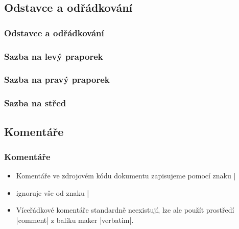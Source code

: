 \subsection{Odstavce a odřádkování}
\begin{frame}
	\frametitle{Odstavce a odřádkování}
	\UnderConstruction
\end{frame}


\begin{frame}
	\frametitle{Sazba na levý praporek}
	\bigskip
\end{frame}


\begin{frame}
	\frametitle{Sazba na pravý praporek}
	\bigskip
\end{frame}


\begin{frame}
	\frametitle{Sazba na střed}
	\centering
	\bigskip
\end{frame}


\subsection{Komentáře}
\begin{frame}[fragile]
	\frametitle{Komentáře}
	\begin{itemize}
		\item Komentáře ve zdrojovém kódu dokumentu zapisujeme pomocí znaku |%
		\item {} ignoruje vše od znaku |%
		\item Víceřádkové komentáře standardně neexistují, lze ale použít prostředí |comment| z balíku maker |verbatim|.
	\end{itemize}
	\medskip
	\medskip
\end{frame}


